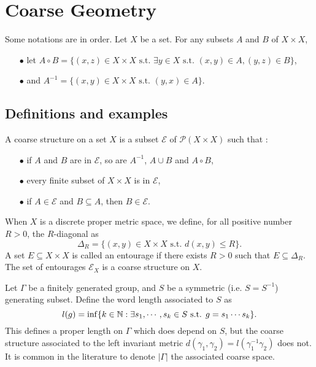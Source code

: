 \section{Coarse Geometry}

Some notations are in order. Let $X$ be a set. For any subsets $A$ and $B$ of $X\times X$, 
\begin{itemize}
\item[$\bullet$] let $A\circ B = \{(x,z)\in X\times X \text{ s.t. } \exists y\in X\text{ s.t. } (x,y)\in A, (y,z)\in B\}$,
\item[$\bullet$] and $A^{-1} = \{(x,y)\in X\times X \text{ s.t. } (y,x)\in A\}$.
\end{itemize}

\subsection{Definitions and examples}

\begin{definition}\cite{RoeCoarse}
A coarse structure on a set $X$ is a subset $\mathcal E$ of $\mathcal P(X\times X)$ such that :
\begin{itemize}
\item[$\bullet$] if $A$ and $B$ are in $\mathcal E$, so are $A^{-1}$, $A\cup B$ and $A\circ B$,
\item[$\bullet$] every finite subset of $X\times X$ is in $\mathcal E$,
\item[$\bullet$] if $A\in\mathcal E$ and $B\subseteq A$, then $B\in \mathcal E$.
\end{itemize}
\end{definition} 

\begin{Expl}
When $X$ is a discrete proper metric space, we define, for all positive number $R>0$, the $R$-diagonal as 
\[\Delta_R= \{(x,y)\in X\times X \text{ s.t. } d(x,y)\leq R\}.\]
A set $E\subseteq X\times X$ is called an entourage if there exists $R>0$ such that $E\subseteq \Delta_R$. The set of entourages $\mathcal E_X$ is a coarse structure on $X$.
\end{Expl}

\begin{Expl} Let $\Gamma$ be a finitely generated group, and $S$ be a symmetric (i.e. $S=S^{-1}$) generating subset. Define the word length associated to $S$ as 
\[l(g) = \inf\{ k\in \mathbb N : \exists s_1,\cdots,s_k\in S \text{ s.t. } g= s_1 \cdots s_k\}.\]
This defines a proper length on $\Gamma$ which does depend on $S$, but the coarse structure associated to the left invariant metric $d(\gamma_1,\gamma_2)= l(\gamma_1^{-1}\gamma_2)$ does not. It is common in the literature to denote $|\Gamma|$ the  associated coarse space.
\end{Expl}

